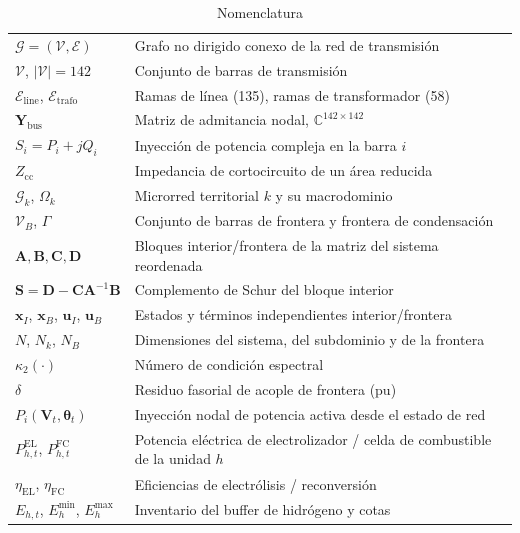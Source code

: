 \begin{table}[!t]
\caption{Nomenclatura}
\label{tab:nomenclature}
\centering
\footnotesize
\begin{tabular}{@{}p{} p{}@{}}
\toprule
$\mathcal{G} = (\mathcal{V}, \mathcal{E})$ & Grafo no dirigido conexo de la red de transmisión \\
$\mathcal{V}$, $|\mathcal{V}| = 142$ & Conjunto de barras de transmisión \\
$\mathcal{E}_{\mathrm{line}}$, $\mathcal{E}_{\mathrm{trafo}}$ & Ramas de línea (135), ramas de transformador (58) \\
$\mathbf{Y}_{\mathrm{bus}}$ & Matriz de admitancia nodal, $\mathbb{C}^{142 \times 142}$ \\
$S_i = P_i + j Q_i$ & Inyección de potencia compleja en la barra $i$ \\
$Z_{\mathrm{cc}}$ & Impedancia de cortocircuito de un área reducida \\
$\mathcal{G}_k$, $\Omega_k$ & Microrred territorial $k$ y su macrodominio \\
$\mathcal{V}_B$, $\Gamma$ & Conjunto de barras de frontera y frontera de condensación \\
$\mathbf{A}, \mathbf{B}, \mathbf{C}, \mathbf{D}$ & Bloques interior/frontera de la matriz del sistema reordenada \\
$\mathbf{S} = \mathbf{D} - \mathbf{C}\mathbf{A}^{-1}\mathbf{B}$ & Complemento de Schur del bloque interior \\
$\mathbf{x}_I$, $\mathbf{x}_B$, $\mathbf{u}_I$, $\mathbf{u}_B$ & Estados y términos independientes interior/frontera \\
$N$, $N_k$, $N_B$ & Dimensiones del sistema, del subdominio y de la frontera \\
$\kappa_2(\cdot)$ & Número de condición espectral \\
$\delta$ & Residuo fasorial de acople de frontera (pu) \\
$P_i(\mathbf{V}_t, \boldsymbol{\theta}_t)$ & Inyección nodal de potencia activa desde el estado de red \\
$P^{\mathrm{EL}}_{h,t}$, $P^{\mathrm{FC}}_{h,t}$ & Potencia eléctrica de electrolizador / celda de combustible de la unidad $h$ \\
$\eta_{\mathrm{EL}}$, $\eta_{\mathrm{FC}}$ & Eficiencias de electrólisis / reconversión \\
$E_{h,t}$, $E_h^{\min}$, $E_h^{\max}$ & Inventario del buffer de hidrógeno y cotas \\

\end{tabular}
\end{table}
